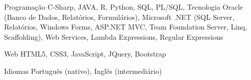 

\begin{cvskills}

  \cvskill
    {Programação} %
    {C-Sharp, JAVA, R, Python, SQL, PL/SQL, Tecnologia Oracle (Banco de Dados, Relatórios, Formulários), Microsoft .NET (SQL Server, Relatórios, Windows Forms, ASP.NET MVC, Team Foundation Server, Linq, Scaffolding), Web Services, Lambda Expressions, Regular Expressions} %

  \cvskill
    {Web} %
    {HTML5, CSS3, JavaScript, JQuery, Bootstrap} %

  \cvskill
    {Idiomas} %
    {Português (nativo), Inglês (intermediário)} %

\end{cvskills}
